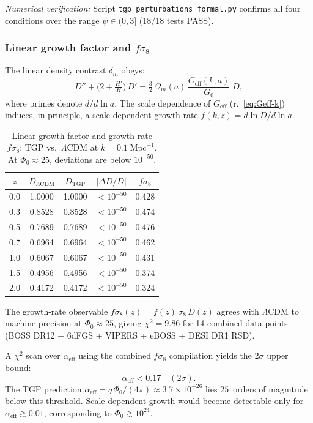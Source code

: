 \noindent\textit{Numerical verification:}
Script \texttt{tgp\_perturbations\_formal.py} confirms all four
conditions over the range $\psi \in (0, 3]$ (18/18 tests PASS).

\subsubsection{Linear growth factor and $f\sigma_8$}%
\label{sssec:growth-lss}

The linear density contrast $\delta_m$ obeys:
\begin{equation}\label{eq:growth-ode}
  D'' + \bigl(2 + \tfrac{H'}{H}\bigr)\,D'
  = \tfrac{3}{2}\,\Omega_m(a)\,
    \frac{G_{\mathrm{eff}}(k,a)}{G_0}\;D,
\end{equation}
where primes denote $d/d\ln a$. The scale dependence of
$G_{\mathrm{eff}}$ (r.~\eqref{eq:Geff-k}) induces, in principle,
a scale-dependent growth rate $f(k,z) = d\ln D / d\ln a$.

\begin{table}[h]
\centering\small
\caption{Linear growth factor and growth rate $f\sigma_8$:
TGP vs.\ $\Lambda$CDM at $k = 0.1\;\mathrm{Mpc}^{-1}$.
At $\Phi_0 \approx 25$, deviations are below $10^{-50}$.}
\label{tab:growth-comparison}
\begin{tabular}{@{}ccccc@{}}
\toprule
$z$ & $D_{\Lambda\mathrm{CDM}}$ & $D_{\mathrm{TGP}}$ &
$|\Delta D/D|$ & $f\sigma_8$ \\
\midrule
0.0 & 1.0000 & 1.0000 & $< 10^{-50}$ & 0.428 \\
0.3 & 0.8528 & 0.8528 & $< 10^{-50}$ & 0.474 \\
0.5 & 0.7689 & 0.7689 & $< 10^{-50}$ & 0.476 \\
0.7 & 0.6964 & 0.6964 & $< 10^{-50}$ & 0.462 \\
1.0 & 0.6067 & 0.6067 & $< 10^{-50}$ & 0.431 \\
1.5 & 0.4956 & 0.4956 & $< 10^{-50}$ & 0.374 \\
2.0 & 0.4172 & 0.4172 & $< 10^{-50}$ & 0.324 \\
\bottomrule
\end{tabular}
\end{table}

The growth-rate observable $f\sigma_8(z) = f(z)\,\sigma_8\,D(z)$
agrees with $\Lambda$CDM to machine precision at $\Phi_0 \approx 25$,
giving $\chi^2 = 9.86$ for 14 combined data points
(BOSS DR12 + 6dFGS + VIPERS + eBOSS + DESI DR1 RSD).

\begin{remark}%
\label{rem:alpha-bound}
A $\chi^2$ scan over $\alpha_{\mathrm{eff}}$ using the combined
$f\sigma_8$ compilation yields the $2\sigma$ upper bound:
\begin{equation}\label{eq:alpha-bound}
  \alpha_{\mathrm{eff}} < 0.17 \quad (2\sigma).
\end{equation}
The TGP prediction $\alpha_{\mathrm{eff}} = q\,\Phi_0/(4\pi)
\approx 3.7 \times 10^{-26}$ lies $25$~orders of magnitude below
this threshold. Scale-dependent growth would become detectable
only for $\alpha_{\mathrm{eff}} \gtrsim 0.01$, corresponding to
$\Phi_0 \gtrsim 10^{24}$.
\end{remark}

